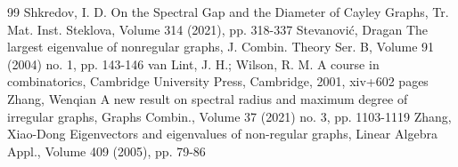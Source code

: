 \documentclass[10pt]{article}
\theoremstyle{definition}
\begin{document}
\begin{thebibliography}{99}
Shkredov, I. D. On the Spectral Gap and the Diameter of Cayley Graphs, Tr. Mat. Inst. Steklova, Volume 314 (2021), pp. 318-337
Stevanović, Dragan The largest eigenvalue of nonregular graphs, J. Combin. Theory Ser. B, Volume 91 (2004) no. 1, pp. 143-146
van Lint, J. H.; Wilson, R. M. A course in combinatorics, Cambridge University Press, Cambridge, 2001, xiv+602 pages
Zhang, Wenqian A new result on spectral radius and maximum degree of irregular graphs, Graphs Combin., Volume 37 (2021) no. 3, pp. 1103-1119
Zhang, Xiao-Dong Eigenvectors and eigenvalues of non-regular graphs, Linear Algebra Appl., Volume 409 (2005), pp. 79-86
\end{thebibliography}
\end{document}
